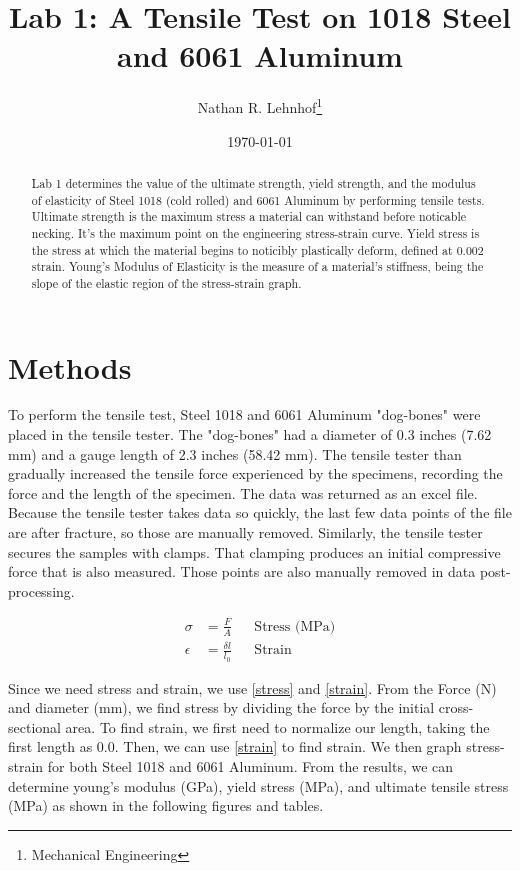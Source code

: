 \documentclass[conf]{new-aiaa} %
\begin{document}
\sloppy %

\title{Lab 1: A Tensile Test on 1018 Steel and 6061 Aluminum}
\author{Nathan R. Lehnhof\footnote{Mechanical Engineering}}
\date{\today}
\maketitle

\begin{abstract}
Lab 1 determines the value of the ultimate strength, yield strength, and the modulus of elasticity of Steel 1018 (cold rolled) and 6061 Aluminum by performing tensile tests.
Ultimate strength is the maximum stress a material can withstand before noticable necking.
It's the maximum point on the engineering stress-strain curve.
Yield stress is the stress at which the material begins to noticibly plastically deform, defined at 0.002 strain.
Young's Modulus of Elasticity is the measure of a material's stiffness, being the slope of the elastic region of the stress-strain graph.
\end{abstract}

\section{Methods}
To perform the tensile test, Steel 1018 and 6061 Aluminum "dog-bones" were placed in the tensile tester.
The "dog-bones" had a diameter of 0.3 inches (7.62 mm) and a gauge length of 2.3 inches (58.42 mm).
The tensile tester than gradually increased the tensile force experienced by the specimens, recording the force and the length of the specimen.
The data was returned as an excel file.
Because the tensile tester takes data so quickly, the last few data points of the file are after fracture, so those are manually removed.
Similarly, the tensile tester secures the samples with clamps.
That clamping produces an initial compressive force that is also measured.
Those points are also manually removed in data post-processing.

\begin{align}
    \sigma &= \frac{F}{A} \label{stress}
    && \text{Stress (MPa)} \\[6pt]
    \epsilon &= \frac{\delta l}{l_0} \label{strain} 
    && \text{Strain}
\end{align}

Since we need stress and strain, we use \autoref{stress} and \autoref{strain}.
From the Force (N) and diameter (mm), we find stress by dividing the force by the initial cross-sectional area.
To find strain, we first need to normalize our length, taking the first length as 0.0.
Then, we can use \autoref{strain} to find strain.
We then graph stress-strain for both Steel 1018 and 6061 Aluminum.
From the results, we can determine young's modulus (GPa), yield stress (MPa), and ultimate tensile stress (MPa) as shown in the following figures and tables.
\end{document}
